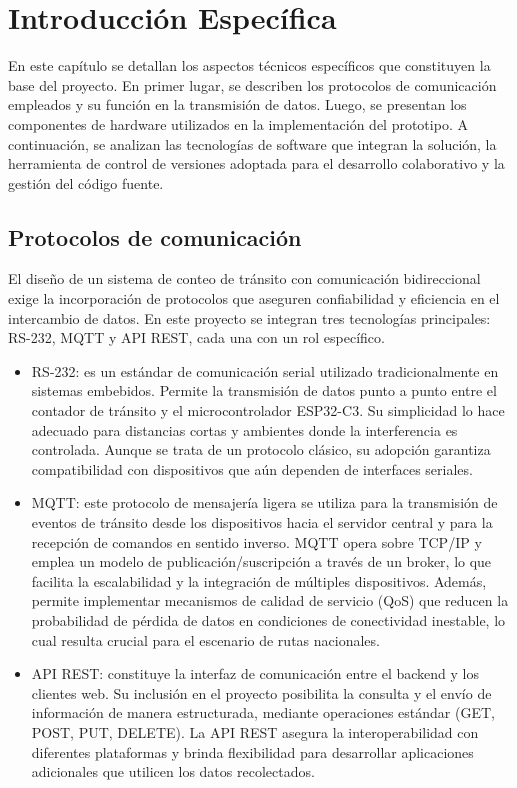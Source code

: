 \chapter{Introducción Específica} %

\label{Chapter2}

En este capítulo se detallan los aspectos técnicos específicos que constituyen la base del proyecto. En primer lugar, se describen los protocolos de comunicación empleados y su función en la transmisión de datos. Luego, se presentan los componentes de hardware utilizados en la implementación del prototipo. A continuación, se analizan las tecnologías de software que integran la solución, la herramienta de control de versiones adoptada para el desarrollo colaborativo y la gestión del código fuente.

\section{Protocolos de comunicación}
El diseño de un sistema de conteo de tránsito con comunicación bidireccional exige la incorporación de protocolos que aseguren confiabilidad y eficiencia en el intercambio de datos. En este proyecto se integran tres tecnologías principales: RS-232, MQTT y API REST, cada una con un rol específico.

\begin{itemize}
	\item RS-232: es un estándar de comunicación serial utilizado tradicionalmente en sistemas embebidos. Permite la transmisión de datos punto a punto entre el contador de tránsito y el microcontrolador ESP32-C3. Su simplicidad lo hace adecuado para distancias cortas y ambientes donde la interferencia es controlada. Aunque se trata de un protocolo clásico, su adopción garantiza compatibilidad con dispositivos que aún dependen de interfaces seriales.
	\item MQTT: este protocolo de mensajería ligera se utiliza para la transmisión de eventos de tránsito desde los dispositivos hacia el servidor central y para la recepción de comandos en sentido inverso. MQTT opera sobre TCP/IP y emplea un modelo de publicación/suscripción a través de un broker, lo que facilita la escalabilidad y la integración de múltiples dispositivos. Además, permite implementar mecanismos de calidad de servicio (QoS) que reducen la probabilidad de pérdida de datos en condiciones de conectividad inestable, lo cual resulta crucial para el escenario de rutas nacionales.
	\item API REST: constituye la interfaz de comunicación entre el backend y los clientes web. Su inclusión en el proyecto posibilita la consulta y el envío de información de manera estructurada, mediante operaciones estándar (GET, POST, PUT, DELETE). La API REST asegura la interoperabilidad con diferentes plataformas y brinda flexibilidad para desarrollar aplicaciones adicionales que utilicen los datos recolectados.
		
\end{itemize}


